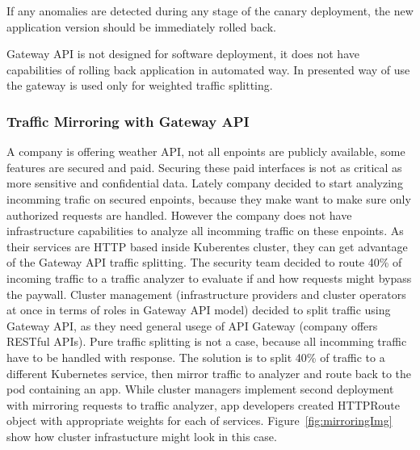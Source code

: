 If any anomalies are detected during any stage of the canary deployment, the new application version should be immediately rolled back.

Gateway API is not designed for software deployment, it does not have capabilities of rolling back application in automated way. In presented way of use the gateway is used only for weighted traffic splitting.


\subsubsection{Traffic Mirroring with Gateway API}
\label{subsubsection:mirroring}

A company is offering weather API, not all enpoints are publicly available, some features are secured and paid. Securing these paid interfaces is not as critical as more sensitive and confidential data. Lately company decided to start analyzing incomming trafic on secured enpoints, because they make want to make sure only authorized requests are handled. However the company does not have infrastructure capabilities to analyze all incomming traffic on these enpoints. As their services are HTTP based inside Kuberentes cluster, they can get advantage of the Gateway API traffic splitting. The security team decided to route 40\% of incoming traffic to a traffic analyzer to evaluate if and how requests might bypass the paywall. Cluster management (infrastructure providers and cluster operators at once in terms of roles in Gateway API model) decided to split traffic using Gateway API, as they need general usege of API Gateway (company offers RESTful APIs). Pure traffic splitting is not a case, because all incomming traffic have to be handled with response. The solution is to split 40\% of traffic to a different Kubernetes service, then mirror traffic to analyzer and route back to the pod containing an app. While cluster managers implement second deployment with mirroring requests to traffic analyzer, app developers created HTTPRoute object with appropriate weights for each of services. Figure~\ref{fig:mirroringImg} show how cluster infrastucture might look in this case.


